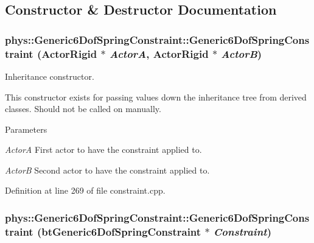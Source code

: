 \subsection{Constructor \& Destructor Documentation}
\hypertarget{classphys_1_1Generic6DofSpringConstraint_a88cf5bfb5db55b957652831c3295b56a}{
\subsubsection[{Generic6DofSpringConstraint}]{\setlength{\rightskip}{0pt plus 5cm}phys::Generic6DofSpringConstraint::Generic6DofSpringConstraint ({\bf ActorRigid} $\ast$ {\em ActorA}, \/  {\bf ActorRigid} $\ast$ {\em ActorB})}}
\label{d1/dc7/classphys_1_1Generic6DofSpringConstraint_a88cf5bfb5db55b957652831c3295b56a}


Inheritance constructor. 

This constructor exists for passing values down the inheritance tree from derived classes. Should not be called on manually. 
\begin{DoxyParams}{Parameters}
\item[{\em ActorA}]First actor to have the constraint applied to. \item[{\em ActorB}]Second actor to have the constraint applied to. \end{DoxyParams}


Definition at line 269 of file constraint.cpp.

\hypertarget{classphys_1_1Generic6DofSpringConstraint_aecd43f6209799587aacee584d3840491}{
\subsubsection[{Generic6DofSpringConstraint}]{\setlength{\rightskip}{0pt plus 5cm}phys::Generic6DofSpringConstraint::Generic6DofSpringConstraint (btGeneric6DofSpringConstraint $\ast$ {\em Constraint})}}
\label{d1/dc7/classphys_1_1Generic6DofSpringConstraint_aecd43f6209799587aacee584d3840491}


